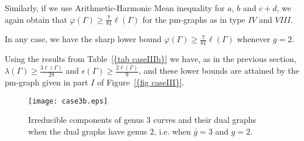 \documentclass[12pt]{amsart}
\theoremstyle{example}
\theoremstyle{definition}
\theoremstyle{notation}
\begin{document}
Similarly, if we use Arithmetic-Harmonic Mean inequality for $a$, $b$ and $c+d$, we again obtain that ${\varphi ({\Gamma})} \geq \frac{7}{81} {\ell ({\Gamma})}$ for the pm-graphs as in type $IV$ and $VIII$.

In any case,  we have the sharp lower bound ${\varphi ({\Gamma})} \geq \frac{7}{81} {\ell ({\Gamma})}$ whenever $g = 2$.

Using the results from {Table~\ref{{tab caseIIIb}}} we have, as in the previous section, ${\lambda ({\Gamma})} \geq \frac{3{\ell ({\Gamma})}}{28}$ and ${\epsilon({\Gamma})} \geq \frac{2{\ell ({\Gamma})}}{9}$, and these lower bounds are attained by the pm-graph given in part $I$ of {Figure~\ref{{fig caseIII}}}.

\begin{figure}
\centering
\texttt{[image: case3b.eps]} \caption{Irreducible components of genus 3 curves and their dual graphs when the dual graphs have genus $2$, i.e. when ${\bar{g}}=3$ and $g=2$.} \label{fig caseIII}
\end{figure}
\end{document}
